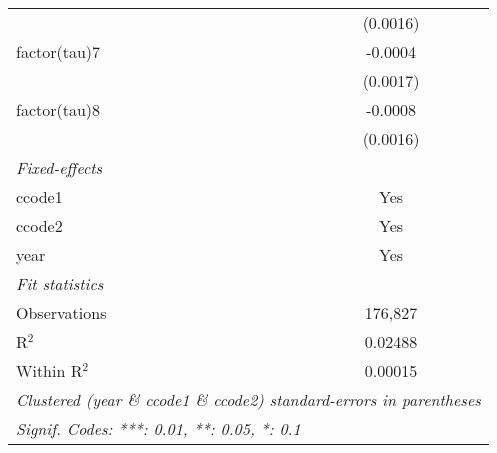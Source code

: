 \begin{tabular}{lc}
                       & (0.0016)\\   
   factor(tau)7        & -0.0004\\   
                       & (0.0017)\\   
   factor(tau)8        & -0.0008\\   
                       & (0.0016)\\   
   \midrule
   \emph{Fixed-effects}\\
   ccode1              & Yes\\  
   ccode2              & Yes\\  
   year                & Yes\\  
   \midrule
   \emph{Fit statistics}\\
   Observations        & 176,827\\  
   R$^2$               & 0.02488\\  
   Within R$^2$        & 0.00015\\  
   \midrule \midrule
   \multicolumn{2}{l}{\emph{Clustered (year \& ccode1 \& ccode2) standard-errors in parentheses}}\\
   \multicolumn{2}{l}{\emph{Signif. Codes: ***: 0.01, **: 0.05, *: 0.1}}\\
\end{tabular}
\par\endgroup



